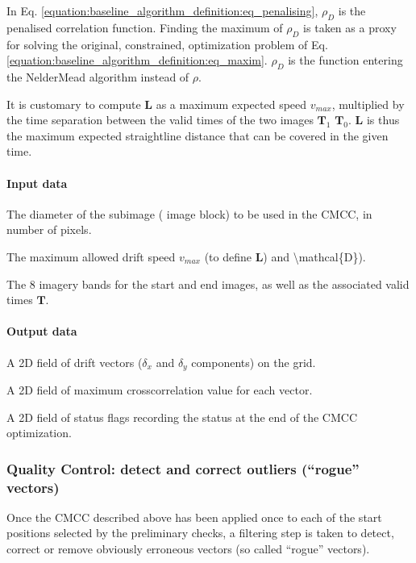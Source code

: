 \documentclass[letterpaper,10pt,english]{jupyterBook}
\begin{document}
\sphinxAtStartPar
In Eq. \eqref{equation:baseline_algorithm_definition:eq_penalising}, \(\rho_D\) is the penalised correlation function. Finding the maximum
of \(\rho_D\) is taken as a proxy for solving the original, constrained,
optimization problem of Eq. \eqref{equation:baseline_algorithm_definition:eq_maxim}. \(\rho_D\) is the function entering the Nelder\sphinxhyphen{}Mead
algorithm instead of \(\rho\).

\sphinxAtStartPar
It is customary to compute \(\mathbf{L}\) as a maximum expected speed
\(v_{max}\), multiplied by the time separation between the valid times of the two images
\(\mathbf{T}_1\) \sphinxhyphen{} \(\mathbf{T}_0\). \(\mathbf{L}\) is thus the maximum
expected straight\sphinxhyphen{}line distance that can be covered in the given time.


\paragraph{Input data}
\label{\detokenize{baseline_algorithm_definition:id16}}
\sphinxAtStartPar
The diameter of the sub\sphinxhyphen{}image ( image block) to be used in the CMCC, in number of pixels.

\sphinxAtStartPar
The maximum allowed drift speed \(v_{max}\) (to define \(\mathbf{L}\)) and \textbackslash{}mathcal\{D\}).

\sphinxAtStartPar
The 8 imagery bands for the start and end images, as well as the associated valid times \(\mathbf{T}\).


\paragraph{Output data}
\label{\detokenize{baseline_algorithm_definition:id17}}
\sphinxAtStartPar
A 2D field of drift vectors (\(\delta_x\) and \(\delta_y\) components) on the  grid.

\sphinxAtStartPar
A 2D field of maximum cross\sphinxhyphen{}correlation value for each vector.

\sphinxAtStartPar
A 2D field of status flags recording the status at the end of the CMCC optimization.


\subsubsection{Quality Control: detect and correct outliers (“rogue” vectors)}
\label{\detokenize{baseline_algorithm_definition:quality-control-detect-and-correct-outliers-rogue-vectors}}
\sphinxAtStartPar
Once the CMCC described above has been applied once to each of the
start positions selected by the preliminary checks, a filtering step
is taken to detect, correct or remove obviously erroneous vectors (so called “rogue” vectors).
\end{document}
